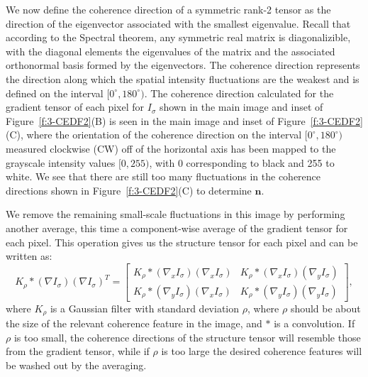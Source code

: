 We now define the coherence direction of a symmetric rank-2 tensor as the direction of the eigenvector associated with the smallest eigenvalue.
Recall that according to the Spectral theorem, any symmetric real matrix is diagonalizible, with the diagonal elements the eigenvalues of the matrix and the associated orthonormal basis formed by the eigenvectors.
The coherence direction represents the direction along which the spatial intensity fluctuations are the weakest and is defined on the interval $[0^{\circ}, 180^{\circ})$.
The coherence direction calculated for the gradient tensor of each pixel for $I_\sigma$ shown in the main image and inset of Figure~\ref{f:3-CEDF2}(B) is seen in the main image and inset of Figure~\ref{f:3-CEDF2}(C), where the orientation of the coherence direction on the interval $[0^{\circ}, 180^{\circ})$ measured clockwise (CW) off of the horizontal axis has been mapped to the grayscale intensity values $[0,255)$, with 0 corresponding to black and 255 to white.
We see that there are still too many fluctuations in the coherence directions shown in Figure~\ref{f:3-CEDF2}(C) to determine $\mathbf{n}$.

We remove the remaining small-scale fluctuations in this image by performing another average, this time a component-wise average of the gradient tensor for each pixel.
This operation gives us the structure tensor for each pixel and can be written as:
\begin{equation}
K_{\rho} \ast (\nabla I_{\sigma})(\nabla I_{\sigma})^T =
\begin{bmatrix}
K_{\rho} \ast ( \nabla_x I_{\sigma})(\nabla_x I_{\sigma}) & K_{\rho} \ast (\nabla_x I_{\sigma})(\nabla_y I_{\sigma}) \\
K_{\rho} \ast (  \nabla_y I_{\sigma})(\nabla_x I_{\sigma}) & K_{\rho} \ast (\nabla_y I_{\sigma})(\nabla_y I_{\sigma})
\end{bmatrix},
\end{equation}
where $K_{\rho}$ is a Gaussian filter with standard deviation $\rho$, where $\rho$ should be about the size of the relevant coherence feature in the image, and $\ast$ is a convolution.
If $\rho$ is too small, the coherence directions of the structure tensor will resemble those from the gradient tensor, while if $\rho$ is too large the desired coherence features will be washed out by the averaging.

